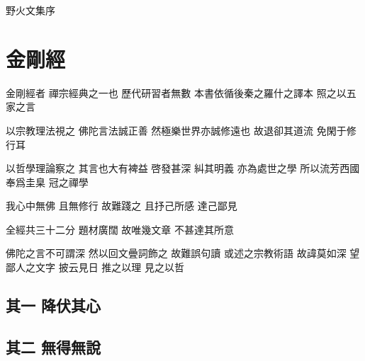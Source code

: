 \documentclass[a4j,12pt]{ltjtarticle}
\begin{document}
	

	
	
	

	\Huge{野火文集序} 
		
	\newpage

    \tableofcontents
	
	\newpage
    \section{金剛經} 

    \normalsize 金剛經者 禪宗經典之一也 歷代研習者無數 本書依循後秦之羅什之譯本 照之以五家之言 

    以宗教理法視之 佛陀言法誠正善 然極樂世界亦誠修遠也 故退卻其道流 免閑于修行耳

    以哲學理論察之 其言也大有裨益 啓發甚深 糾其明義 亦為處世之學 所以流芳西國 奉爲圭臬 冠之禪學
    
    我心中無佛 且無修行 故難踐之 且抒己所感 達己鄙見 

    全經共三十二分 題材廣闊 故唯幾文章 不甚達其所意
    
    佛陀之言不可謂深 然以回文曡詞飾之 故難誤句讀 或述之宗教術語 故諱莫如深 望鄙人之文字 披云見日 推之以理 見之以哲

    \subsection{其一 降伏其心}
    
    \subsection{其二 無得無說}
    
\end{document}
